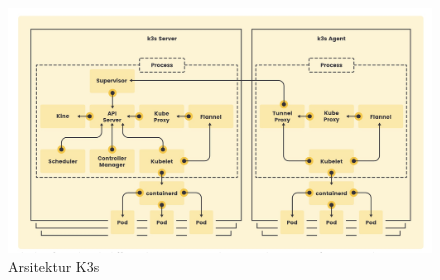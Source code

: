 \begin{figure}[ht]
  \centering
  \includegraphics[width=1\textwidth]{resources/chapter-2/arsitektur-k3s.jpg}
  \caption{Arsitektur K3s \parencite{k3s}}
  \label{fig:arsitektur-k3s}
\end{figure}
